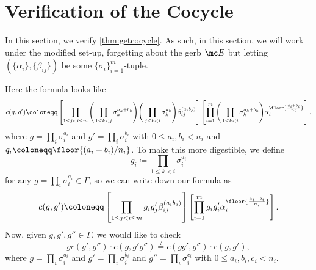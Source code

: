 \documentclass{article}
\numberwithin{equation}{section}
\begin{document}
\newpage
\appendix
\section{Verification of the Cocycle} \label{sec:verifycocycle}
In this section, we verify \autoref{thm:getcocycle}. As such, in this section, we will work under the modified set-up, forgetting about the gerb $\mc E$ but letting $(\{\alpha_i\},\{\beta_{ij}\})$ be some $\{\sigma_i\}_{i=1}^m$-tuple.

Here the formula looks like
\[c(g,g')\coloneqq\left[\prod_{1\le j<i\le m}\Bigg(\prod_{1\le k<j}\sigma_k^{a_k+b_k}\Bigg)\Bigg(\prod_{j\le k<i}\sigma_k^{a_k}\Bigg)\beta_{ij}^{(a_ib_j)}\right]\left[\prod_{i=1}^m\Bigg(\prod_{1\le k<i}\sigma_k^{a_k+b_k}\Bigg)\alpha_i^{\floor{\frac{a_i+b_i}{n_i}}}\right],\]
where $g=\prod_i\sigma_i^{a_i}$ and $g'=\prod_i\sigma_i^{b_i}$ with $0\le a_i,b_i<n_i$ and $q_i\coloneqq\floor{(a_i+b_i)/n_i}$. To make this more digestible, we define
\[g_i\coloneqq\prod_{1\le k<i}\sigma_i^{a_i}\]
for any $g=\prod_i\sigma_i^{a_i}\in\Gamma$, so we can write down our formula as
\[c(g,g')\coloneqq\left[\prod_{1\le j<i\le m}g_ig'_j\beta_{ij}^{(a_ib_j)}\right]\left[\prod_{i=1}^mg_ig'_i\alpha_i^{\floor{\frac{a_i+b_i}{n_i}}}\right].\]
Now, given $g,g',g''\in\Gamma$, we would like to check
\[gc(g',g'')\cdot c(g,g'g'')\stackrel?=c(gg',g'')\cdot c(g,g'),\]
where $g=\prod_i\sigma_i^{a_i}$ and $g'=\prod_i\sigma_i^{b_i}$ and $g''=\prod_i\sigma_i^{c_i}$ with $0\le a_i,b_i,c_i<n_i$.
\end{document}

